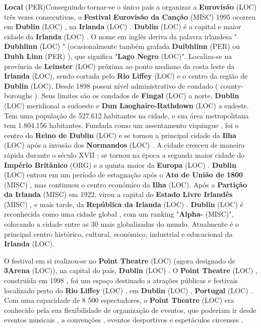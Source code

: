\documentclass[12pt,a4paper]{article}
\begin{document}
\textbf{Local} (PER)Conseguindo tornar-se o único país a organizar a \textbf{Eurovisão} (LOC) três vezes consecutivas, o \textbf{Festival Eurovisão da Canção} (MISC) 1995 ocorreu em \textbf{Dublin} (LOC) , na \textbf{Irlanda} (LOC) . \textbf{Dublin} (LOC) é a capital e maior cidade da \textbf{Irlanda} (LOC) . O nome em inglês deriva da palavra irlandesa " \textbf{Dubhlinn} (LOC) " (ocasionalmente também grafada \textbf{Duibhlinn} (PER) ou \textbf{Dubh Linn} (PER) ), que significa "\textbf{Lago Negro} (LOC)". Localiza-se na província de \textbf{Leinster} (LOC) próxima ao ponto mediano da costa leste da \textbf{Irlanda} (LOC), sendo cortada pelo \textbf{Rio Liffey} (LOC) e o centro da região de \textbf{Dublin} (LOC). Desde 1898 possui nível administrativo de condado ( county-boroughs ). Seus limites são os condados de \textbf{Fingal} (LOC) a norte, \textbf{Dublin} (LOC) meridional a sudoeste e \textbf{Dun Laoghaire-Rathdown} (LOC) a sudeste. Tem uma população de 527.612 habitantes na cidade, e sua área metropolitana tem 1.804.156 habitantes. Fundada como um assentamento viquingue , foi o centro do \textbf{Reino de Dublin} (LOC) e se tornou a principal cidade da \textbf{Ilha} (LOC) após a invasão dos \textbf{Normandos} (LOC) . A cidade cresceu de maneira rápida durante o século XVII ; se tornou na época a segunda maior cidade do \textbf{Império Britânico} (ORG) e a quinta maior da \textbf{Europa} (LOC) . \textbf{Dublin} (LOC) entrou em um período de estagnação após o \textbf{Ato de União de 1800} (MISC) , mas continuou o centro económico da \textbf{Ilha} (LOC). Após a \textbf{Partição da Irlanda} (MISC) em 1922, virou a capital do \textbf{Estado Livre Irlandês} (MISC) , e mais tarde, da \textbf{República da Irlanda} (LOC) . \textbf{Dublin} (LOC) é reconhecida como uma cidade global , com um ranking "\textbf{Alpha-} (MISC)", colocando a cidade entre as 30 mais globalizadas do mundo. Atualmente é o principal centro histórico, cultural, económico, industrial e educacional da \textbf{Irlanda} (LOC).

O festival em si realizou-se no \textbf{Point Theatre} (LOC) (agora designado de \textbf{3Arena} (LOC)), na capital do país, \textbf{Dublin} (LOC) . O \textbf{Point Theatre} (LOC) , construída em 1998 , foi um espaço destinado a atrações públicas e festivais localizado perto do \textbf{Rio Liffey} (LOC) , em \textbf{Dublin} (LOC) , \textbf{Portugal} (LOC) . Com uma capacidade de 8 500 espectadores, o \textbf{Point Theatre} (LOC) era conhecido pela sua flexibilidade de organização de eventos, que poderiam ir desde eventos musicais , a convenções , eventos desportivos e espetáculos circenses .
\end{document}
